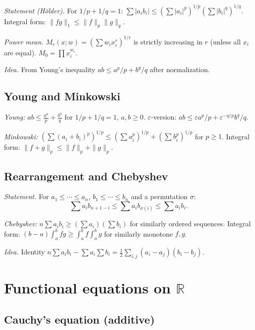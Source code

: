\textit{Statement (H\"older).} For $1/p+1/q=1$: $\sum|a_i b_i|\leq(\sum|a_i|^p)^{1/p}(\sum|b_i|^q)^{1/q}$. Integral form: $\|fg\|_1\leq\|f\|_p\|g\|_q$.

\textit{Power mean.} $M_r(x;w)=(\sum w_i x_i^r)^{1/r}$ is strictly increasing in $r$ (unless all $x_i$ are equal). $M_0=\prod x_i^{w_i}$.

\textit{Idea.} From Young's inequality $ab\leq a^p/p+b^q/q$ after normalization.

\medskip

\subsection{Young and Minkowski}
\label{subsec:young-minkowski}

\textit{Young:} $ab\leq\frac{a^p}{p}+\frac{b^q}{q}$ for $1/p+1/q=1$, $a,b\geq0$. $\varepsilon$-version: $ab\leq\varepsilon a^p/p+\varepsilon^{-q/p}b^q/q$.

\textit{Minkowski:} $(\sum(a_i+b_i)^p)^{1/p}\leq(\sum a_i^p)^{1/p}+(\sum b_i^p)^{1/p}$ for $p\geq1$. Integral form: $\|f+g\|_p\leq\|f\|_p+\|g\|_p$.

\medskip

\subsection{Rearrangement and Chebyshev}
\label{subsec:rearrangement}

\textit{Statement.} For $a_1\leq\cdots\leq a_n$, $b_1\leq\cdots\leq b_n$ and a permutation $\sigma$:
$$\sum a_i b_{n+1-i}\leq\sum a_i b_{\sigma(i)}\leq\sum a_i b_i.$$

\textit{Chebyshev:} $n\sum a_i b_i\geq(\sum a_i)(\sum b_i)$ for similarly ordered sequences. Integral form: $(b-a)\int_a^b fg\geq\int_a^b f\int_a^b g$ for similarly monotone $f,g$.

\textit{Idea.} Identity $n\sum a_i b_i-\sum a_i\sum b_i=\frac12\sum_{i,j}(a_i-a_j)(b_i-b_j)$.

\medskip

\section{Functional equations on $\mathbb{R}$}
\label{sec:functional-equations}

\subsection{Cauchy's equation (additive)}
\label{subsec:cauchy-additive}

